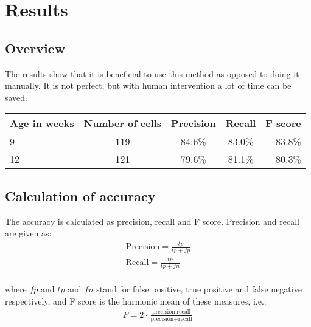 \chapter{Results}\label{cha:Research}
%

\section{Overview}\label{sec:research:history}
The results show that it is beneficial to use this method as opposed to doing it manually. It is not perfect, but with human intervention a lot of time can be saved.

\begin{center}
\begin{tabular}{ l | c | c | c | r }
  Age in weeks & Number of cells & Precision & Recall & F score \\
  \hline
  9 & 119 & 84.6\% & 83.0\% & 83.8\% \\
  12 & 121 & 79.6\% & 81.1\% & 80.3\% \\
  \hline  
\end{tabular}
\end{center}

\section{Calculation of accuracy}\label{sec:research:history}
The accuracy is calculated as precision, recall and F score. Precision and recall are given as:
\begin{align*}
\text{Precision} = \frac{tp}{tp + fp}\\
\text{Recall} = \frac{tp}{tp + fn}\\
\end{align*}

where $fp$ and $tp$ and $fn$ stand for false positive, true positive and false negative respectively,
and F score is the harmonic mean of these measures, i.e.:
\begin{align*}
F = 2 \cdot \frac{\text{precision} \cdot \text{recall}}{\text{precision} + \text{recall}}
\end{align*}





%

